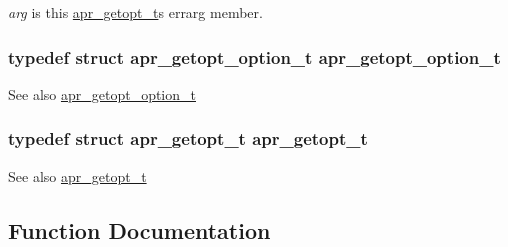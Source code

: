 {\itshape arg} is this {\ttfamily \hyperlink{structapr__getopt__t}{apr\+\_\+getopt\+\_\+t}\textquotesingle{}s} {\ttfamily errarg} member. 
\subsubsection[{\texorpdfstring{apr\+\_\+getopt\+\_\+option\+\_\+t}{apr_getopt_option_t}}]{\setlength{\rightskip}{0pt plus 5cm}typedef struct {\bf apr\+\_\+getopt\+\_\+option\+\_\+t} {\bf apr\+\_\+getopt\+\_\+option\+\_\+t}}\hypertarget{group__apr__getopt_ga114d2af52f3573eaeee2ffa73b2c4ff5}{}\label{group__apr__getopt_ga114d2af52f3573eaeee2ffa73b2c4ff5}
\begin{DoxySeeAlso}{See also}
\hyperlink{structapr__getopt__option__t}{apr\+\_\+getopt\+\_\+option\+\_\+t} 
\end{DoxySeeAlso}
\subsubsection[{\texorpdfstring{apr\+\_\+getopt\+\_\+t}{apr_getopt_t}}]{\setlength{\rightskip}{0pt plus 5cm}typedef struct {\bf apr\+\_\+getopt\+\_\+t} {\bf apr\+\_\+getopt\+\_\+t}}\hypertarget{group__apr__getopt_gaed49565eab64803e93f76d0c40d6873d}{}\label{group__apr__getopt_gaed49565eab64803e93f76d0c40d6873d}
\begin{DoxySeeAlso}{See also}
\hyperlink{structapr__getopt__t}{apr\+\_\+getopt\+\_\+t} 
\end{DoxySeeAlso}


\subsection{Function Documentation}
